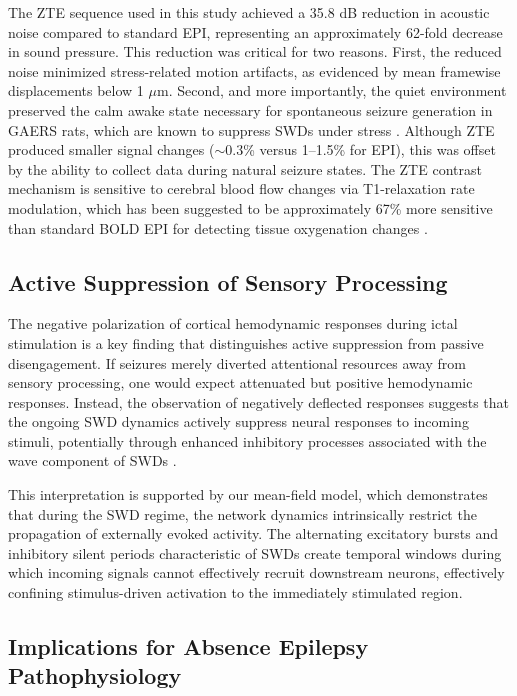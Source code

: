 \documentclass[12pt]{article}
\begin{document}
The ZTE sequence used in this study achieved a 35.8 dB reduction in acoustic noise compared to standard EPI, representing an approximately 62-fold decrease in sound pressure. This reduction was critical for two reasons. First, the reduced noise minimized stress-related motion artifacts, as evidenced by mean framewise displacements below 1 $\mu$m. Second, and more importantly, the quiet environment preserved the calm awake state necessary for spontaneous seizure generation in GAERS rats, which are known to suppress SWDs under stress \citep{depaulis2016gaers}. Although ZTE produced smaller signal changes ($\sim$0.3\% versus 1--1.5\% for EPI), this was offset by the ability to collect data during natural seizure states. The ZTE contrast mechanism is sensitive to cerebral blood flow changes via T1-relaxation rate modulation, which has been suggested to be approximately 67\% more sensitive than standard BOLD EPI for detecting tissue oxygenation changes \citep{mishra2013zte, logothetis2001bold}.

\subsection{Active Suppression of Sensory Processing}

The negative polarization of cortical hemodynamic responses during ictal stimulation is a key finding that distinguishes active suppression from passive disengagement. If seizures merely diverted attentional resources away from sensory processing, one would expect attenuated but positive hemodynamic responses. Instead, the observation of negatively deflected responses suggests that the ongoing SWD dynamics actively suppress neural responses to incoming stimuli, potentially through enhanced inhibitory processes associated with the wave component of SWDs \citep{david2008imaging}.

This interpretation is supported by our mean-field model, which demonstrates that during the SWD regime, the network dynamics intrinsically restrict the propagation of externally evoked activity. The alternating excitatory bursts and inhibitory silent periods characteristic of SWDs create temporal windows during which incoming signals cannot effectively recruit downstream neurons, effectively confining stimulus-driven activation to the immediately stimulated region.

\subsection{Implications for Absence Epilepsy Pathophysiology}
\end{document}
